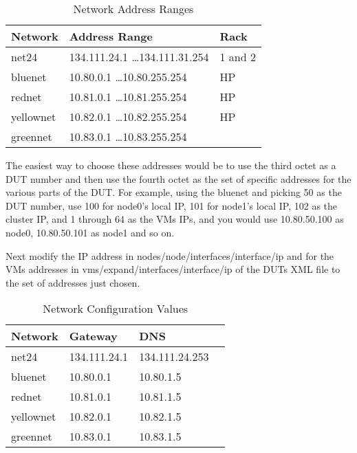 \documentclass[twoside]{article}
\begin{document}
\begin{table}
\begin{center}
\begin{tabular}{|l|l|l|}
\hline
Network & Address Range & Rack \\
\hline
net24 & 134.111.24.1 \ldots 134.111.31.254 & 1 and 2 \\
\hline
bluenet & 10.80.0.1 \ldots 10.80.255.254 & HP \\
\hline
rednet & 10.81.0.1 \ldots 10.81.255.254 & HP \\
\hline
yellownet & 10.82.0.1 \ldots 10.82.255.254 & HP \\
\hline
greennet & 10.83.0.1 \ldots 10.83.255.254 & \\
\hline
\end{tabular}
\end{center}
\caption{Network Address Ranges}
\end{table}

The easiest way to choose these addresses would be to use the third
octet as a DUT number and then use the fourth octet as the set of
specific addresses for the various parts of the DUT.
For example, using the bluenet and picking 50 as the DUT number,
use 100 for node0's local IP, 101 for node1's local IP,
102 as the cluster IP, and 1 through 64 as the VMs IPs, and
you would use 10.80.50.100 as node0, 10.80.50.101 as node1
and so on.

Next modify the IP address in nodes/node/interfaces/interface/ip
and for the VMs addresses in vms/expand/interfaces/interface/ip
of the DUTs XML file to the set of addresses just chosen.

\begin{table}
\begin{center}
\begin{tabular}{|l|l|l|l|}
\hline
Network & Gateway & DNS \\
\hline
net24 & 134.111.24.1 & 134.111.24.253 \\
\hline
bluenet & 10.80.0.1 & 10.80.1.5 \\
\hline
rednet & 10.81.0.1 & 10.81.1.5 \\
\hline
yellownet & 10.82.0.1 & 10.82.1.5 \\
\hline
greennet & 10.83.0.1 & 10.83.1.5 \\
\hline
\end{tabular}
\end{center}
\caption{Network Configuration Values}
\end{table}
\end{document}
